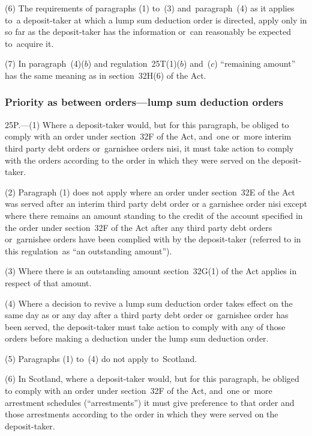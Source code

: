 \documentclass[12pt,a4paper]{article}
\begin{document}
(6) The requirements of paragraphs (1) to~(3) and~paragraph~(4) as it applies to~a deposit-taker at which a lump sum deduction order is directed, apply only in so far as the deposit-taker has the information or~can reasonably be expected to~acquire it.

(7) In paragraph~(4)($b$)  and regulation~25T(1)($b$)  and~($c$)  “remaining amount” has the same meaning as in section~32H(6) of the Act.


\subsubsection[25P. Priority as between orders---lump sum deduction orders]{Priority as between orders---lump sum deduction orders}

25P.---(1)  Where a deposit-taker would, but for this paragraph, be obliged to comply with an order under section~32F of the Act, and~one or~more interim third party debt orders or~garnishee orders nisi, it must take action to comply with the orders according to the order in which they were served on the deposit-taker.

(2) Paragraph (1) does not apply where an order under section~32E of the Act was served after an interim third party debt order or a garnishee order nisi except where there remains an amount standing to the credit of the account specified in the order under section~32F of the Act after any third party debt orders or~garnishee orders have been complied with by the deposit-taker (referred to in this regulation~as “an outstanding amount”).

(3) Where there is an outstanding amount section~32G(1) of the Act applies in respect of that amount.

(4) Where a decision to revive a lump sum deduction order takes effect on the same day as or any day after a third party debt order or~garnishee order has been served, the deposit-taker must take action to comply with any of those orders before making a deduction under the lump sum deduction order.

(5) Paragraphs (1) to~(4) do not apply to~Scotland.

(6) In Scotland, where a deposit-taker would, but for this paragraph, be obliged to comply with an order under section~32F of the Act, and~one or~more arrestment schedules (“arrestments”) it must give preference to that order and those arrestments according to the order in which they were served on the deposit-taker.
\end{document}

